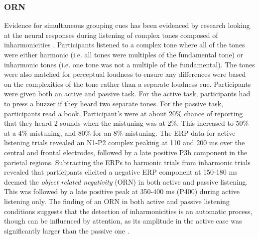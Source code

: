 
\subsubsection{ORN}

Evidence for simultaneous grouping cues has been evidenced by research looking at the neural responses during listening of complex tones composed of inharmonicities \cite{Alain2001,Alain2002}.  Participants listened to a complex tone where all of the tones were either harmonic (i.e. all tones were multiples of the fundamental tone) or inharmonic tones (i.e. one tone was not a multiple of the fundamental).  The tones were also matched for perceptual loudness to ensure any differences were based on the complexities of the tone rather than a separate loudness cue.  Participants were given both an active and passive task.  For the active task, participants had to press a buzzer if they heard two separate tones.  For the passive task, participants read a book.   Participant's were at about 20\% chance of reporting that they heard 2 sounds when the mistuning was at 2\%.  This increased to 50\% at a 4\% mistuning, and 80\% for an 8\% mistuning.  The ERP data for active listening trials revealed an N1-P2 complex peaking at 110 and 200 ms over the central and frontal electrodes, followed by a late positive P3b component in the parietal regions.   Subtracting the ERPs to harmonic trials from inharmonic trials revealed that participants elicited a negative ERP component at 150-180 ms deemed the \textit{object related negativity} (ORN) in both active and passive listening.  This was followed by a late positive peak at 350-400 ms (P400) during active listening only.  The finding of an ORN in both active and passive listening conditions suggests that the detection of inharmonicities is an automatic process, though can be influenced by attention, as its amplitude in the active case was significantly larger than the passive one \cite{Alain2001,Alain2002}.


